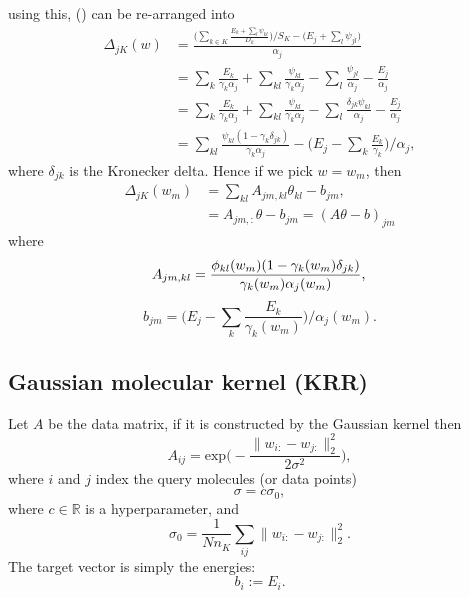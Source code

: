 \documentclass[12pt]{article}
\def\D{\displaystyle}
\begin{document}
using this, () can be re-arranged into
\begin{equation}
	\label{eq:delta_split}
	\begin{split}
		\Delta_{jK}(w)&= \frac{\D \Big(\sum_{k\in K} \frac{E_k + \sum_l \psi_{kl}}{D_k} \Big)/ S_K - \Big(E_j + \sum_l \psi_{jl}\Big)}{\alpha_j} \\
		&= \sum_k \frac{E_k}{\gamma_k\alpha_j} + \sum_{kl} \frac{\psi_{kl}}{\gamma_k\alpha_j} - \sum_{l} \frac{\psi_{jl}}{\alpha_j} - \frac{E_j}{\alpha_j}\\
		&= \sum_k \frac{E_k}{\gamma_k\alpha_j} + \sum_{kl} \frac{\psi_{kl}}{\gamma_k\alpha_j} - \sum_{l} \frac{\delta_{jk}\psi_{kl}}{\alpha_j} - \frac{E_j}{\alpha_j}\\
		&= \sum_{kl} \frac{\psi_{kl} (1-\gamma_k\delta_{jk})}{\gamma_k\alpha_j} - \Big(E_j - \sum_k\frac{E_k}{\gamma_k}\Big)/\alpha_j,
	\end{split}
\end{equation}
where $\delta_{jk}$ is the Kronecker delta. Hence if we pick $w = w_m$, then
\begin{equation}
	\begin{split}
		\Delta_{jK}(w_m) &= \sum_{kl} A_{jm, kl} \theta_{kl} - b_{jm}, \\
		&= A_{jm,:}\theta - b_{jm} = (A\theta - b)_{jm}
	\end{split}	
\end{equation}
where
\begin{equation}
	\label{eq:rosemi_linear}
	A_{jm, kl} = \frac{\phi_{kl}(w_m)(1 - \gamma_k(w_m) \delta_{jk})}{\gamma_k(w_m) \alpha_j(w_m)},\\
\end{equation}
\begin{equation}
	b_{jm} = \Big(E_j - \sum_k\frac{E_k}{\gamma_k(w_m)}\Big)/\alpha_j(w_m).
\end{equation}

\subsection{Gaussian molecular kernel (KRR)} 
\label{subsec:gaussian}
Let $A$ be the data matrix, if it is constructed by the Gaussian kernel then
\begin{equation}
	\label{eq:gaussian_mol}
	A_{ij} = \text{exp}\Big(-\frac{\|w_{i:} - w_{j:}\|^2_2}{2\sigma^2}\Big),
\end{equation}
where $i$ and $j$ index the query molecules (or data points)
\begin{equation}
	\sigma = c\sigma_0,
\end{equation}
where $c \in \mathbb{R}$ is a hyperparameter, and
\begin{equation}
	\sigma_0 = \frac{1}{Nn_K}\sum_{ij}\|w_{i:} - w_{j:}\|^2_2.
\end{equation} 
The target vector is simply the energies:
\begin{equation}
	\label{eq:lineartargetvector}
	b_i := E_i.
\end{equation}
\end{document}
